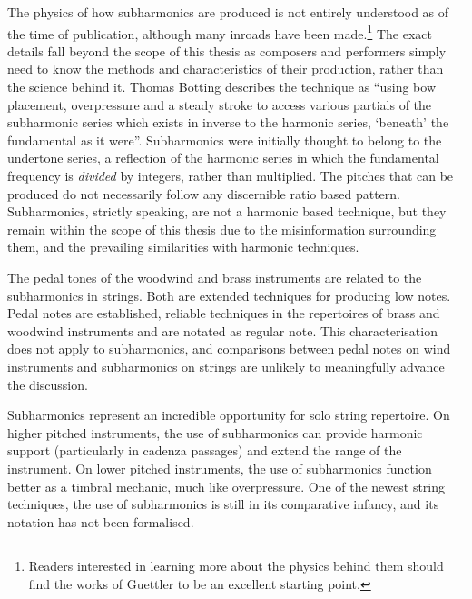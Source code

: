 The physics of how subharmonics are produced is not entirely understood as of the time of publication, although many inroads have been made.\footnote{Readers interested in learning more about the physics behind them should find the works of Guettler to be an excellent starting point.}\autocite[]{guettlerBowedStringDevelopment2002}
The exact details fall beyond the scope of this thesis as composers and performers simply need to know the methods and characteristics of their production, rather than the science behind it.
Thomas Botting describes the technique as ``using bow placement, overpressure and a steady stroke to access various partials of the subharmonic series which exists in inverse to the harmonic series, ‘beneath’ the fundamental as it were''.\autocite[16]{bottingDevelopingPersonalVocabulary2019}
Subharmonics were initially thought to belong to the undertone series, a reflection of the harmonic series in which the fundamental frequency is \emph{divided} by integers, rather than multiplied.\autocite[]{shaahinmohajeriEqualdivisionsoflengthEdl240edo2019}
The pitches that can be produced do not necessarily follow any discernible ratio based pattern.\autocite[]{guettlerWaveAnalysisString1994}
Subharmonics, strictly speaking, are not a harmonic based technique, but they remain within the scope of this thesis due to the misinformation surrounding them, and the prevailing similarities with harmonic techniques.

The pedal tones of the woodwind and brass instruments are related to the subharmonics in strings.
Both are extended techniques for producing low notes. 
Pedal notes are established, reliable techniques in the repertoires of brass and woodwind instruments and are notated as regular note. 
This characterisation does not apply to subharmonics, and comparisons between pedal notes on wind instruments and subharmonics on strings are unlikely to meaningfully advance the discussion.

Subharmonics represent an incredible opportunity for solo string repertoire. 
On higher pitched instruments, the use of subharmonics can provide harmonic support (particularly in cadenza passages) and extend the range of the instrument. 
On lower pitched instruments, the use of subharmonics function better as a timbral mechanic, much like overpressure. 
One of the newest string techniques, the use of subharmonics is still in its comparative infancy, and its notation has not been formalised. 

